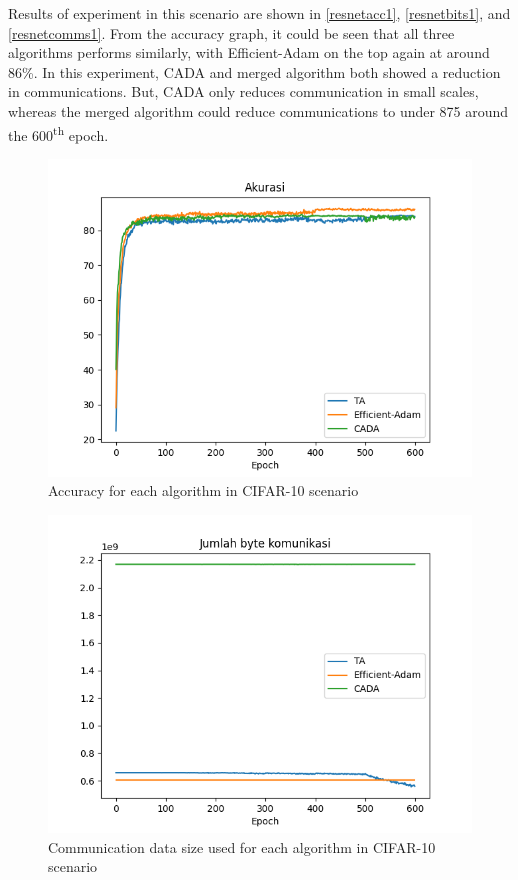 Results of experiment in this scenario are shown in \autoref{resnetacc1}, \autoref{resnetbits1}, and \autoref{resnetcomms1}. From the accuracy graph, it could be seen that all three algorithms performs similarly, with Efficient-Adam on the top again at around 86\%. In this experiment, CADA and merged algorithm both showed a reduction in communications. But, CADA only reduces communication in small scales, whereas the merged algorithm could reduce communications to under 875 around the 600\textsuperscript{th} epoch.

\begin{figure}[htbp]
  \centering
  \includegraphics[width=0.8\columnwidth]{resources/resnet_acc.png}
  \caption{\label{resnetacc1}Accuracy for each algorithm in CIFAR-10 scenario}
\end{figure}
\begin{figure}[htbp]
  \centering
  \includegraphics[width=0.8\columnwidth]{resources/resnet_bits.png}
  \caption{\label{resnetbits1}Communication data size used for each algorithm in CIFAR-10 scenario}
\end{figure}
